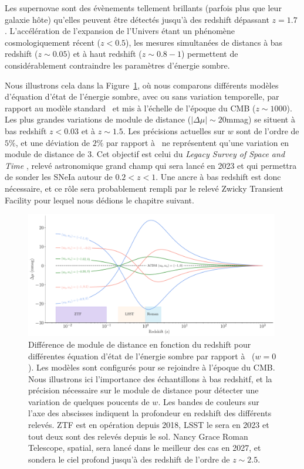 \documentclass[../main/main.tex]{subfiles}
\begin{document}
Les supernovae sont des évènements tellement brillants (parfois plus que
leur galaxie hôte) qu'elles peuvent être détectés jusqu'à des redshift
dépassant $z=1.7$ \citep{Rubin2013, Jones2013}. L'accélération de
l'expansion de l'Univers étant un phénomène cosmologiquement récent
($z<0.5$), les mesures simultanées de distancs à bas redshift ($z\sim0.05$) et à
haut redshift ($z\sim0.8-1$) permettent de considérablement contraindre
les paramètres d'énergie sombre.

Nous illustrons cela dans la Figure~\ref{fig:evolv_DEstate}, où nous
comparons différents modèles d'équation d'état de l'énergie sombre, avec
ou sans variation temporelle, par rapport au modèle standard \lcdm\ et
mis à l'échelle de l'époque du CMB ($z\sim1000$). Les plus grandes
variations de module de distance ($\lvert\Delta\mu\rvert\sim20$mmag) se situent à bas
redshift $z<0.03$ et à $z\sim1.5$. Les précisions actuelles sur $w$ sont
de l'ordre de $5\%$, et une déviation de $2\%$ par rapport à \lcdm\ ne
représentent qu'une variation en module de distance de
$3$\textperthousand. Cet objectif est celui du \textit{Legacy Survey of Space and Time} \citep[LSST;][]{LSSTbook2}, relevé
astronomique grand champ qui sera lancé en 2023 et qui permettra de
sonder les SNeIa autour de $0.2<z<1$. Une ancre à bas redshift est donc
nécessaire, et ce rôle sera probablement rempli par le relevé Zwicky
Transient Facility \citep[ZTF;][]{GrahamZTF2019,BellmZTF2019} pour
lequel nous dédions le chapitre suivant.

\begin{figure}[ht]
  \centering
  \includegraphics[width=0.99\textwidth]{../figures/01_cosmology/darkenergy_variation.pdf}
  \caption[Différence de module de distance en fonction du redshift pour
  différentes équation d'état de l'énergie sombre.]{Différence de module de distance en fonction du redshift pour
  différentes équation d'état de l'énergie sombre par rapport à \lcdm\
  ($w=0$). Les modèles sont configurés pour se rejoindre à l'époque du
  CMB. Nous illustrons ici l'importance des échantillons à bas redshitf,
et la précision nécessaire sur le module de distance pour détecter une
variation de quelques poucents de $w$. Les bandes de couleurs sur l'axe
des abscisses indiquent la profondeur en redshift des différents
relevés. ZTF est en opération depuis 2018, LSST le sera en 2023 et tout
deux sont des relevés depuis le sol. Nancy Grace Roman Telescope, spatial, sera
lancé dans le meilleur des cas en 2027, et sondera le ciel profond
jusqu'à des redshift de l'ordre de $z\sim2.5$.} 
  \label{fig:evolv_DEstate}
\end{figure}

%
%
\end{document}

